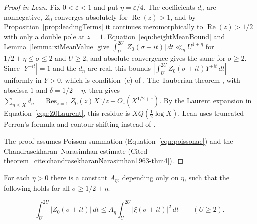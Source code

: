 \begin{proof}[Proof in Lean]

\leanok


Fix $0<\varepsilon<1$ and put $\eta=\varepsilon/4$. The coefficients $d_n$ are nonnegative, $Z_0$ converges absolutely for $\operatorname{Re}(z)>1$, and by Proposition~\ref{prop:leadingTerms} it continues meromorphically to $\operatorname{Re}(z)>1/2$ with only a double pole at $z=1$. Equation~\ref{eqn:heightMeanBound} and Lemma~\ref{lemma:xiMeanValue} give $\int_U^{2U}|Z_0(\sigma+it)|\,dt\ll_\eta U^{1+\eta}$ for $1/2+\eta\leq\sigma\leq2$ and $U\geq2$, and absolute convergence gives the same for $\sigma\geq2$. Since $|Y^{\pm it}|=1$ and the $d_n$ are real, this bounds $|\int_U^{2U}Z_0(\sigma\pm it)Y^{\pm it}\,dt|$ uniformly in $Y>0$, which is condition~(c) of \cite[Theorem~1.1]{alberts2025}. The Tauberian theorem \cite[Theorem~1.1]{alberts2025}, with abscissa $1$ and $\delta=1/2-\eta$, then gives $\sum_{n\leq X}d_n=\operatorname{Res}_{z=1}Z_0(z)X^z/z+O_\varepsilon(X^{1/2+\varepsilon})$. By the Laurent expansion in Equation~\ref{eqn:Z0Laurent}, this residue is $XQ(\frac12\log X)$. Lean uses truncated Perron's formula and contour shifting instead of \cite[Theorem~1.1]{alberts2025}.

The proof assumes Poisson summation (Equation~\ref{eqn:poissonae}) and the Chandrasekharan--Narasimhan estimate (Cited theorem~\ref{cite:chandrasekharanNarasimhan1963-thm4}).

\end{proof}

\begin{equationnode}

\label{eqn:heightMeanBound}


\leanok

For each $\eta>0$ there is a constant $A_\eta$, depending only on $\eta$, such that the following holds for all $\sigma\geq1/2+\eta$.

\begin{equation*} \int_U^{2U}|Z_0(\sigma+it)|\,dt \leq A_\eta\int_U^{2U}|\xi(\sigma+it)|^2\,dt \qquad (U \geq 2). \end{equation*}

\end{equationnode}

